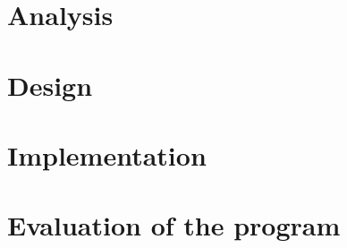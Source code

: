 




\newpage
\thispagestyle{empty}
\mbox{}



\setcounter{secnumdepth}{3}
\setcounter{tocdepth}{1}

\tableofcontents

\part{Analysis}











\part{Design}









\part{Implementation}






\part{Evaluation of the program}



